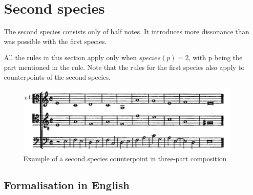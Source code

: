 \section{Second species}
The second species consists only of half notes. It introduces more dissonance than was possible with the first species. 

All the rules in this section apply only when $species(p) =2$, with p being the part mentioned in the rule. Note that the rules for the first species also apply to counterpoints of the second species.

\begin{figure}[h]
    \centering
    \includegraphics[width=1\textwidth]{Images/Species_examples/2sp-example.png}
    \caption{Example of a second species counterpoint in three-part composition}
    \label{fig:example-2sp}
\end{figure}
\subsection{Formalisation in English}\label{formalisation-en-2nd}
